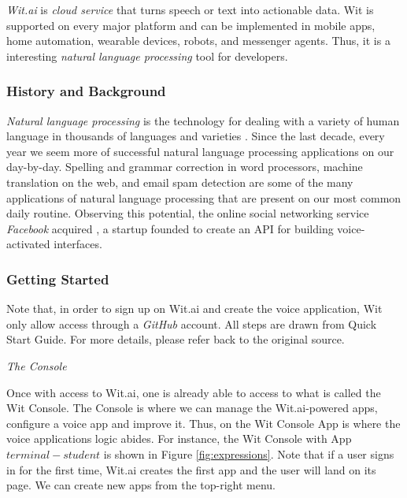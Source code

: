 \emph{Wit.ai} is \emph{cloud service} that turns speech or text into actionable data.
Wit is supported on every major platform and can be implemented in mobile apps, home automation, wearable devices, robots, and messenger agents.
Thus, it is a interesting \emph{natural language processing} tool for developers.

\subsubsection{History and Background}

\emph{Natural language processing} is the technology for dealing with a variety of human language in thousands of languages and varieties \cite{jurafsky2014speech}. 
Since the last decade, every year we seem more of successful natural language processing applications on our day-by-day.
Spelling and grammar correction in word processors, machine translation on the web, and email spam detection are some of the many applications of natural language processing that are present on our most common daily routine.
Observing this potential, the online social networking service \emph{Facebook} acquired \cite{1_wit.ai_2016}, a startup founded to create an API for building voice-activated interfaces. 

\subsubsection{Getting Started}

Note that, in order to sign up on Wit.ai and create the voice application, Wit only allow access through a \emph{GitHub} \cite{github_2016} account.
All steps are drawn from \cite{1_wit.ai_2016} Quick Start Guide.
For more details, please refer back to the original source.

\emph{The Console}

Once with access to Wit.ai, one is already able to access to what is called the Wit Console. 
The Console is where we can manage the Wit.ai-powered apps, configure a voice app and improve it.
Thus, on the Wit Console App is where the voice applications logic abides.
For instance, the Wit Console with App $terminal-student$ is shown in Figure \ref{fig:expressions}.
Note that if a user signs in for the first time, Wit.ai creates the first app and the user will land on its page.
We can create new apps from the top-right menu.

